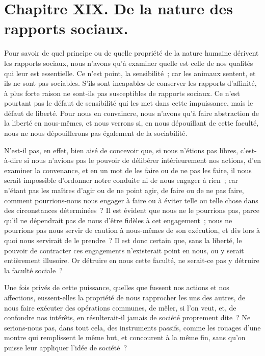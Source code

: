 \documentclass[french,twoside]{book} %
\newcommand\chapteropen{} %
\newcommand\chaptercont{} %
\begin{document}
\chapteropen
\chapter[{Chapitre XIX. De la nature des rapports sociaux.}]{Chapitre XIX. De la nature des rapports sociaux.}\renewcommand{\leftmark}{Chapitre XIX. De la nature des rapports sociaux.}


\chaptercont
\noindent Pour savoir de quel principe ou de quelle propriété de la nature humaine dérivent les rapports sociaux, nous n’avons qu’à examiner quelle est celle de nos qualités qui leur est essentielle. Ce n’est point, la sensibilité ; car les animaux sentent, et ils ne sont pas sociables. S’ils sont incapables de conserver les rapports d’affinité, à plus forte raison ne sont-ils pas susceptibles de rapports sociaux. Ce n’est pourtant pas le défaut de sensibilité qui les met dans cette impuissance, mais le défaut de liberté. Pour nous en convaincre, nous n’avons qu’à faire abstraction de la liberté en nous-mêmes, et nous verrons si, en nous dépouillant de cette faculté, nous ne nous dépouillerons pas également de la sociabilité.\par
N’est-il pas, en effet, bien aisé de concevoir que, si nous n’étions pas libres, c’est-à-dire si nous n’avions pas le pouvoir de délibérer intérieurement nos actions, d’en examiner la convenance, et en un mot de les faire ou de ne pas les faire, il nous serait impossible d’ordonner notre conduite ni de nous engager à rien ; car n’étant pas les maîtres d’agir ou de ne point agir, de faire ou de ne pas faire, comment pourrions-nous nous engager à faire ou à éviter telle ou telle chose dans des circonstances déterminées ? Il est évident que nous ne le pourrions pas, parce qu’il ne dépendrait pas de nous d’être fidèles à cet engagement ; nous ne pourrions pas nous servir de caution à nous-mêmes de son exécution, et dès lors à quoi nous servirait de le prendre ? Il est donc certain que, sans la liberté, le pouvoir de contracter ces engagements n’existerait point en nous, ou y serait entièrement illusoire. Or détruire en nous cette faculté, ne serait-ce pas y détruire la faculté sociale ?\par
Une fois privés de cette puissance, quelles que fussent nos actions et nos affections, eussent-elles la propriété de nous rapprocher les uns des autres, de nous faire exécuter des opérations communes, de mêler, si l’on veut, et, de confondre nos intérêts, en résulterait-il jamais de société proprement dite ? Ne serions-nous pas, dans tout cela, des instruments passifs, comme les rouages d’une montre qui remplissent le même but, et concourent à la même fin, sans qu’on puisse leur appliquer l’idée de société ?\par
\end{document}
